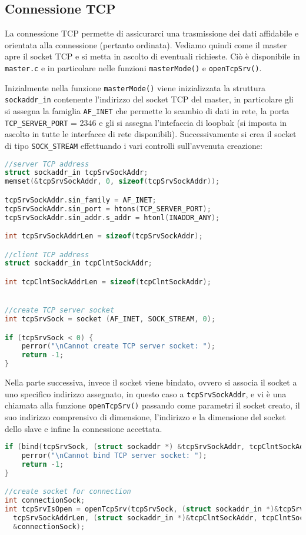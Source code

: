 \documentclass[11pt,fleqn]{book} %
\begin{document}
\subsection{Connessione TCP}
La connessione TCP permette di assicurarci una trasmissione dei dati affidabile e orientata alla connessione (pertanto ordinata). Vediamo quindi come il master apre il socket TCP e si metta in ascolto di eventuali richieste.
Ciò è disponibile in \texttt{master.c} e in particolare nelle funzioni \texttt{masterMode()} e \texttt{openTcpSrv()}.

Inizialmente nella funzione \texttt{masterMode()} viene inizializzata la struttura \texttt{sockaddr\_in} contenente l'indirizzo del socket TCP del master, in particolare gli si assegna la famiglia \texttt{AF\_INET} che permette lo scambio di dati in rete, la porta \texttt{TCP\_SERVER\_PORT} = 2346 e gli si assegna l'intefaccia di loopbak (si imposta in ascolto in tutte le interfacce di rete disponibili).
Successivamente si crea il socket di tipo \texttt{SOCK\_STREAM} effettuando i vari controlli sull'avvenuta creazione:
\begin{lstlisting}[language=C]
//server TCP address
struct sockaddr_in tcpSrvSockAddr;
memset(&tcpSrvSockAddr, 0, sizeof(tcpSrvSockAddr));

tcpSrvSockAddr.sin_family = AF_INET;
tcpSrvSockAddr.sin_port = htons(TCP_SERVER_PORT);
tcpSrvSockAddr.sin_addr.s_addr = htonl(INADDR_ANY);

int tcpSrvSockAddrLen = sizeof(tcpSrvSockAddr);

//client TCP address
struct sockaddr_in tcpClntSockAddr;

int tcpClntSockAddrLen = sizeof(tcpClntSockAddr);


//create TCP server socket
int tcpSrvSock = socket (AF_INET, SOCK_STREAM, 0);

if (tcpSrvSock < 0) {
	perror("\nCannot create TCP server socket: ");
	return -1;
}
\end{lstlisting}

Nella parte successiva, invece il socket viene bindato, ovvero si associa il socket a uno specifico indirizzo assegnato, in questo caso a \texttt{tcpSrvSockAddr}, e vi è una chiamata alla funzione \texttt{openTcpSrv()} passando come parametri il socket creato, il suo indirizzo comprensivo di dimensione, l'indirizzo e la dimensione del socket dello slave e infine la connessione accettata.

\begin{lstlisting}[language=C]
if (bind(tcpSrvSock, (struct sockaddr *) &tcpSrvSockAddr, tcpClntSockAddrLen) < 0) {
	perror("\nCannot bind TCP server socket: ");
	return -1;
}

//create socket for connection 
int connectionSock;
int tcpSrvIsOpen = openTcpSrv(tcpSrvSock, (struct sockaddr_in *)&tcpSrvSockAddr,
  tcpSrvSockAddrLen, (struct sockaddr_in *)&tcpClntSockAddr, tcpClntSockAddrLen,
  &connectionSock);

\end{lstlisting}
\end{document}
